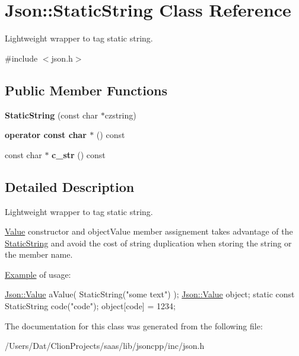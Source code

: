 \hypertarget{class_json_1_1_static_string}{}\section{Json\+:\+:Static\+String Class Reference}
\label{class_json_1_1_static_string}


Lightweight wrapper to tag static string.  




{\ttfamily \#include $<$json.\+h$>$}

\subsection*{Public Member Functions}
\begin{DoxyCompactItemize}
\item 
{\bfseries Static\+String} (const char $\ast$czstring)\hypertarget{class_json_1_1_static_string_afb6baf1ec078ce76f0b0f9b39d19437f}{}\label{class_json_1_1_static_string_afb6baf1ec078ce76f0b0f9b39d19437f}

\item 
{\bfseries operator const char $\ast$} () const \hypertarget{class_json_1_1_static_string_ac2b334d46bbea4c0227e508fc66433e9}{}\label{class_json_1_1_static_string_ac2b334d46bbea4c0227e508fc66433e9}

\item 
const char $\ast$ {\bfseries c\+\_\+str} () const \hypertarget{class_json_1_1_static_string_ab86fc6a3183adf12fdba4b370acf1754}{}\label{class_json_1_1_static_string_ab86fc6a3183adf12fdba4b370acf1754}

\end{DoxyCompactItemize}


\subsection{Detailed Description}
Lightweight wrapper to tag static string. 

\hyperlink{class_json_1_1_value}{Value} constructor and object\+Value member assignement takes advantage of the \hyperlink{class_json_1_1_static_string}{Static\+String} and avoid the cost of string duplication when storing the string or the member name.

\hyperlink{namespace_example}{Example} of usage\+: 
\begin{DoxyCode}
\hyperlink{class_json_1_1_value}{Json::Value} aValue( StaticString(\textcolor{stringliteral}{"some text"}) );
\hyperlink{class_json_1_1_value}{Json::Value} object;
\textcolor{keyword}{static} \textcolor{keyword}{const} StaticString code(\textcolor{stringliteral}{"code"});
\textcolor{keywordtype}{object}[code] = 1234;
\end{DoxyCode}
 

The documentation for this class was generated from the following file\+:\begin{DoxyCompactItemize}
\item 
/\+Users/\+Dat/\+Clion\+Projects/saas/lib/jsoncpp/inc/json.\+h\end{DoxyCompactItemize}
